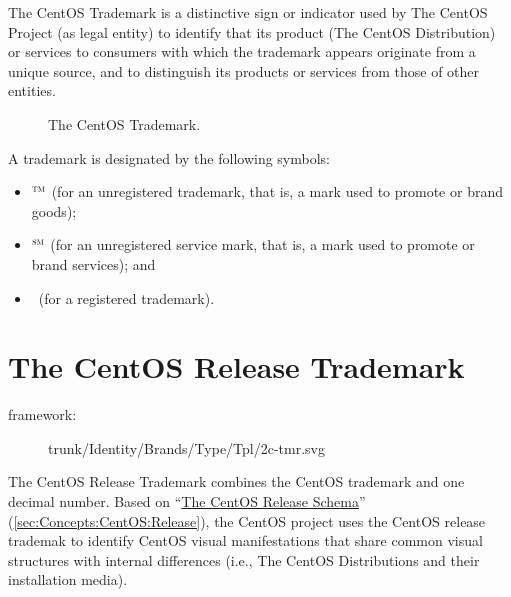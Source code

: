 \noindent The CentOS Trademark is a distinctive sign or indicator used
by The CentOS Project (as legal entity) to identify that its product
(The CentOS Distribution) or services to consumers with which the
trademark appears originate from a unique source, and to distinguish
its products or services from those of other entities.

\begin{figure}
\begin{center}
\end{center}
\caption{The CentOS Trademark.%
    \label{fig:Concepts:Identity:Brands:Trademark}}
\end{figure}

A trademark is designated by the following symbols:

\begin{itemize}

\item $^{\textup{\textsc{tm}}}$ (for an unregistered trademark, that
is, a mark used to promote or brand goods);

\item $^{\textup{\textsc{sm}}}$ (for an unregistered service mark,
that is, a mark used to promote or brand services); and
            
\item \textregistered\ (for a registered trademark).
            
\end{itemize}

\section{The CentOS Release Trademark}
\hypertarget{sec:Concepts:Identity:Brands:Release}{}
\label{sec:Concepts:Identity:Brands:Release}

\begin{description}
\item[framework:] trunk/Identity/Brands/Type/Tpl/2c-tmr.svg
\end{description}

\noindent The CentOS Release Trademark combines the CentOS trademark
and one decimal number.  Based on
``\hyperlink{sec:Concepts:CentOS:Release}{The CentOS Release Schema}''
(\autoref{sec:Concepts:CentOS:Release}), the CentOS project uses the
CentOS release trademak to identify CentOS visual manifestations that
share common visual structures with internal differences (i.e., The
CentOS Distributions and their installation media).

